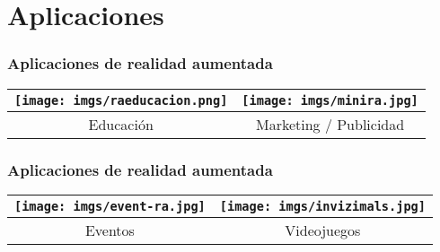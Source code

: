\section{Aplicaciones}
\frame
{
\frametitle{Aplicaciones de realidad aumentada}
{\setlength{\arrayrulewidth}{0mm}
  \begin{tabular}{| c | c |}
  \hline
  \texttt{[image: imgs/raeducacion.png]} & \texttt{[image: imgs/minira.jpg]}\\
  \hline
  Educación & Marketing / Publicidad\\
  \hline
  \end{tabular}
}
}

\frame
{
\frametitle{Aplicaciones de realidad aumentada}
{\setlength{\arrayrulewidth}{0mm}
  \begin{tabular}{| c | c |}
  \hline
  \texttt{[image: imgs/event-ra.jpg]} & \texttt{[image: imgs/invizimals.jpg]}\\
  \hline
  Eventos & Videojuegos\\
  \hline
  \end{tabular}
}
}
